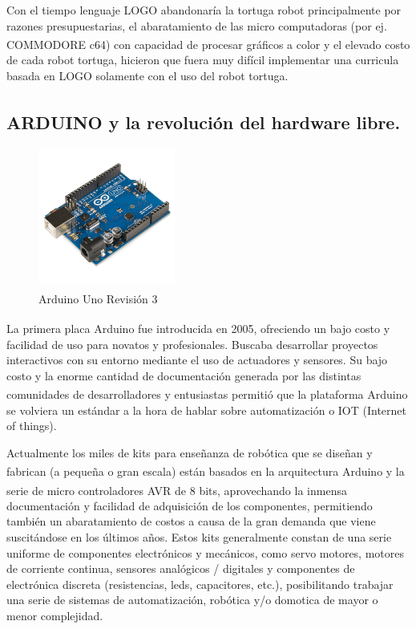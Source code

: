 Con el tiempo lenguaje LOGO abandonaría la tortuga robot principalmente por razones presupuestarias, el abaratamiento de las micro computadoras (por ej. COMMODORE\textsuperscript{\textregistered} c64) con capacidad de procesar gráficos a color y el elevado costo de cada robot tortuga, hicieron que fuera muy difícil implementar una curricula basada en LOGO solamente con el uso del robot tortuga.

\subsection{ARDUINO\textsuperscript{\texttrademark} y la revolución del hardware libre.} 

\begin{figure}
  \begin{center}
    \includegraphics[width=0.4\textwidth]{figuras/Arduino_Uno_-_R3.jpg}
    \caption[Caption for LOF]{Arduino\textsuperscript{\texttrademark} Uno Revisión 3}
       
    \label{fig:arduinouno }
  \end{center}
\end{figure}

La primera placa Arduino\textsuperscript{\texttrademark} fue introducida en 2005, ofreciendo un bajo costo y facilidad de uso para novatos y profesionales. Buscaba desarrollar proyectos interactivos con su entorno mediante el uso de actuadores y sensores. Su bajo costo y la enorme cantidad de documentación generada por las distintas comunidades de desarrolladores y entusiastas permitió que la plataforma Arduino\textsuperscript{\texttrademark} se volviera un estándar a la hora de hablar sobre automatización o IOT (Internet of things).

Actualmente los miles de kits para enseñanza de robótica que se diseñan y fabrican (a pequeña o gran escala) están basados en la arquitectura Arduino\textsuperscript{\texttrademark} y la serie de micro controladores AVR\textsuperscript{\textregistered} de 8 bits, aprovechando la inmensa documentación y facilidad de adquisición de los componentes, permitiendo también un abaratamiento de costos a causa de la gran demanda que viene suscitándose en los últimos años. Estos kits generalmente constan de una serie uniforme de componentes electrónicos y mecánicos, como servo motores, motores de corriente continua, sensores analógicos / digitales y componentes de electrónica discreta (resistencias, leds, capacitores, etc.), posibilitando trabajar una serie de sistemas de automatización, robótica y/o domotica de mayor o menor complejidad.

